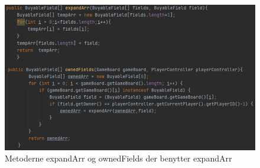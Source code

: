\begin{flushleft}
\begin{figure}[H] %
    \centering
    \includegraphics[width=14cm]{Report/figures/Codesections/Menu_expandArr()+ownedFields().PNG}
    \caption{Metoderne expandArr og ownedFields der benytter expandArr}
    \label{Expanding arrays}
\end{figure}


\end{flushleft}